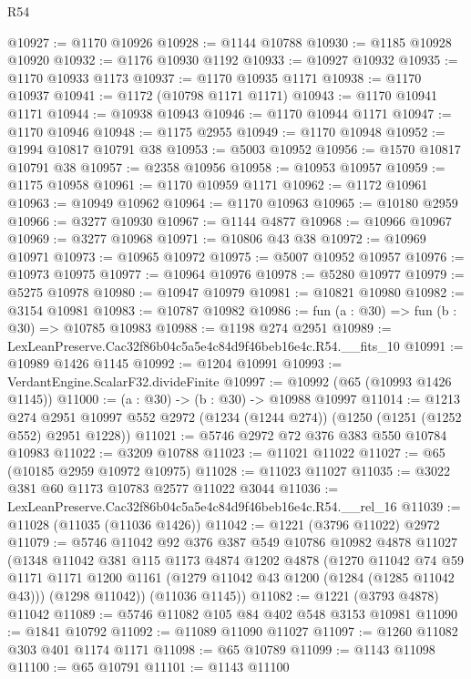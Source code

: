 \begin{lexlean}{R54}
\begin{coremodule}
@10927 := @1170 @10926
@10928 := @1144 @10788
@10930 := @1185 @10928 @10920
@10932 := @1176 @10930 @1192
@10933 := @10927 @10932
@10935 := @1170 @10933 @1173
@10937 := @1170 @10935 @1171
@10938 := @1170 @10937
@10941 := @1172 (@10798 @1171 @1171)
@10943 := @1170 @10941 @1171
@10944 := @10938 @10943
@10946 := @1170 @10944 @1171
@10947 := @1170 @10946
@10948 := @1175 @2955
@10949 := @1170 @10948
@10952 := @1994 @10817 @10791 @38
@10953 := @5003 @10952
@10956 := @1570 @10817 @10791 @38
@10957 := @2358 @10956
@10958 := @10953 @10957
@10959 := @1175 @10958
@10961 := @1170 @10959 @1171
@10962 := @1172 @10961
@10963 := @10949 @10962
@10964 := @1170 @10963
@10965 := @10180 @2959
@10966 := @3277 @10930
@10967 := @1144 @4877
@10968 := @10966 @10967
@10969 := @3277 @10968
@10971 := @10806 @43 @38
@10972 := @10969 @10971
@10973 := @10965 @10972
@10975 := @5007 @10952 @10957
@10976 := @10973 @10975
@10977 := @10964 @10976
@10978 := @5280 @10977
@10979 := @5275 @10978
@10980 := @10947 @10979
@10981 := @10821 @10980
@10982 := @3154 @10981
@10983 := @10787 @10982
@10986 := fun (a : @30) => fun (b : @30) => @10785 @10983
@10988 := @1198 @274 @2951
@10989 := LexLeanPreserve.Cac32f86b04c5a5e4c84d9f46beb16e4c.R54.__fits_10
@10991 := @10989 @1426 @1145
@10992 := @1204 @10991
@10993 := VerdantEngine.ScalarF32.divideFinite
@10997 := @10992 (@65 (@10993 @1426 @1145))
@11000 := (a : @30) -> (b : @30) -> @10988 @10997
@11014 := @1213
    @274
    @2951
    @10997
    @552
    @2972
    (@1234 (@1244 @274))
    (@1250 (@1251 (@1252 @552) @2951 @1228))
@11021 := @5746 @2972 @72 @376 @383 @550 @10784 @10983
@11022 := @3209 @10788
@11023 := @11021 @11022
@11027 := @65 (@10185 @2959 @10972 @10975)
@11028 := @11023 @11027
@11035 := @3022 @381 @60 @1173 @10783 @2577 @11022 @3044
@11036 := LexLeanPreserve.Cac32f86b04c5a5e4c84d9f46beb16e4c.R54.__rel_16
@11039 := @11028 (@11035 (@11036 @1426))
@11042 := @1221 (@3796 @11022) @2972
@11079 := @5746
    @11042
    @92
    @376
    @387
    @549
    @10786
    @10982
    @4878
    @11027
    (@1348
      @11042
      @381
      @115
      @1173
      @4874
      @1202
      @4878
      (@1270
        @11042
        @74
        @59
        @1171
        @1171
        @1200
        @1161
        (@1279 @11042 @43 @1200 (@1284 (@1285 @11042 @43)))
        (@1298 @11042))
      (@11036 @1145))
@11082 := @1221 (@3793 @4878) @11042
@11089 := @5746 @11082 @105 @84 @402 @548 @3153 @10981
@11090 := @1841 @10792
@11092 := @11089 @11090 @11027
@11097 := @1260 @11082 @303 @401 @1174 @1171
@11098 := @65 @10789
@11099 := @1143 @11098
@11100 := @65 @10791
@11101 := @1143 @11100

\end{coremodule}
\end{lexlean}
